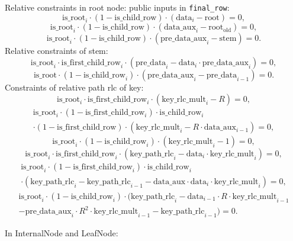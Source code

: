 Relative constraints in root node:
public inputs in \verb|final_row|:
\[ \mathrm{is\_root}_i \cdot (1-\mathrm{is\_child\_row}) \cdot (\mathrm{data}_i - \mathrm{root}) = 0, \]
\[ \mathrm{is\_root}_i \cdot (1-\mathrm{is\_child\_row}) \cdot (\mathrm{data\_aux}_i - \mathrm{root}_\text{old}) = 0, \]
\[ \mathrm{is\_root}_i \cdot (1-\mathrm{is\_child\_row}) \cdot (\mathrm{pre\_data\_aux}_i - \mathrm{stem}) = 0. \]
Relative constraints of stem:
\[ \mathrm{is\_root}_i \cdot \mathrm{is\_first\_child\_row}_i \cdot (\mathrm{pre\_data}_i - \mathrm{data}_i \cdot \mathrm{pre\_data\_aux}_i) = 0, \]
\[ \mathrm{is\_root} \cdot (1 - \mathrm{is\_child\_row}_i) \cdot (\mathrm{pre\_data\_aux}_i - \mathrm{pre\_data}_{i-1}) = 0. \]
Constraints of relative path rlc of key:
\[ \mathrm{is\_root}_i \cdot \mathrm{is\_first\_child\_row}_i \cdot (\mathrm{key\_rlc\_mult}_i - R) = 0, \]
\begin{multline*}
  \mathrm{is\_root}_i \cdot (1 - \mathrm{is\_first\_child\_row}_i) \cdot \mathrm{is\_child\_row}_i \\
  \cdot (1 - \mathrm{is\_first\_child\_row}) \cdot (\mathrm{key\_rlc\_mult}_i - R \cdot \mathrm{data\_aux}_{i-1}) = 0,
\end{multline*}
\[ \mathrm{is\_root}_i \cdot (1 - \mathrm{is\_child\_row}_i) \cdot (\mathrm{key\_rlc\_mult}_i - 1) = 0, \]
\[ \mathrm{is\_root}_i \cdot \mathrm{is\_first\_child\_row}_i \cdot (\mathrm{key\_path\_rlc}_i - \mathrm{data}_i \cdot \mathrm{key\_rlc\_mult}_i) = 0, \]
\begin{multline*}
    \mathrm{is\_root}_i \cdot (1 - \mathrm{is\_first\_child\_row}_i) \cdot \mathrm{is\_child\_row}_i \\
    \cdot (\mathrm{key\_path\_rlc}_i - \mathrm{key\_path\_rlc}_{i-1} - \mathrm{data\_aux} \cdot \mathrm{data}_i \cdot \mathrm{key\_rlc\_mult}_i) = 0,
\end{multline*}
\begin{multline*}
    \mathrm{is\_root}_i \cdot (1 - \mathrm{is\_child\_row}_i) \cdot (\mathrm{key\_path\_rlc}_i - \mathrm{data}_{i-1} \cdot R \cdot \mathrm{key\_rlc\_mult}_{i-1} \\
    - \mathrm{pre\_data\_aux}_i\cdot R^2 \cdot \mathrm{key\_rlc\_mult}_{i-1} - \mathrm{key\_path\_rlc}_{i-1}) = 0.
\end{multline*}

In InternalNode and LeafNode:

